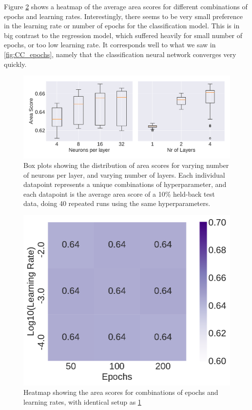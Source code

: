 \documentclass[10pt, twocolumn]{article}
\begin{document}
Figure \ref{fig:HP_epochs_lrs} shows a heatmap of the average area scores for different combinations of epochs and learning rates. Interestingly, there seems to be very small preference in the learning rate or number of epochs for the classification model. This is in big contrast to the regression model, which suffered heavily for small number of epochs, or too low learning rate. It corresponds well to what we saw in \cref{fig:CC_epochs}, namely that the classification neural network converges very quickly.



\begin{figure}[H]
    \centering
    \includegraphics[scale=0.4]{../figs/CC_TF_boxplot.pdf}
    \caption{Box plots showing the distribution of area scores for varying number of neurons per layer, and varying number of layers. Each individual datapoint represents a unique combinations of hyperparameter, and each datapoint is the average area score of a 10\% held-back test data, doing 40 repeated runs using the same hyperparameters.}
    \label{fig:HP_neurons_layers_CC}
\end{figure}

\begin{figure}[H]
    \centering
    \includegraphics[scale=0.38]{../figs/CC_TF_lr_epoch_heatmap.pdf}
    \caption{Heatmap showing the area scores for combinations of epochs and learning rates, with identical setup as \cref{fig:HP_neurons_layers_CC}}
    \label{fig:HP_epochs_lrs}
\end{figure}
\end{document}
